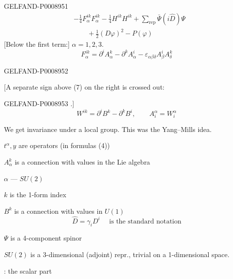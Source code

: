 \begin{GelfandAdjacentEvidence}{GELFAND-P000895}{1}
\begin{equation*}
\begin{aligned}
&-\frac14F_\alpha^{ik}F_\alpha^{ik}-\frac14H^{ik}H^{ik}
+\sum_{\mathrm{rep}}\bar\Psi(i\hat D)\Psi\\
&\qquad+\frac12(D\varphi)^2-P(\varphi)
\end{aligned}
\tag{6}
\end{equation*}
[Below the first term:] $\alpha=1,2,3.$
\begin{equation*}
F_\alpha^{ik}=\partial^i A_\alpha^k-\partial^k A_\alpha^i
-\varepsilon_{\alpha\beta\delta}A_\beta^i A_\delta^k
\tag{7}
\end{equation*}
\end{GelfandAdjacentEvidence}
\begin{GelfandAdjacentEvidence}{GELFAND-P000895}{2}

[A separate sign above (7) on the right is crossed out: 
\end{GelfandAdjacentEvidence}
\begin{GelfandAdjacentEvidence}{GELFAND-P000895}{3}
.]
\begin{equation*}
W^{ik}=\partial^i B^k-\partial^k B^i,\qquad A_i^\alpha=W_i^\alpha
\tag{8}
\end{equation*}

We get invariance under a local group. This was the Yang–Mills idea.

$t^\alpha,y$ are operators (in formulas (4))

$A_\alpha^k$ is a connection with values in the Lie algebra

$\alpha$ — $SU(2)$

$k$ is the 1-form index

$B^k$ is a connection with values in $U(1)$
\begin{equation*}
\hat D=\gamma_i D^i\quad\text{ is the standard notation}
\tag{9}
\end{equation*}

$\Psi$ is a 4-component spinor

$SU(2)$ is a 3-dimensional (adjoint) repr., trivial on a 1-dimensional space.

: the scalar part
\end{GelfandAdjacentEvidence}
